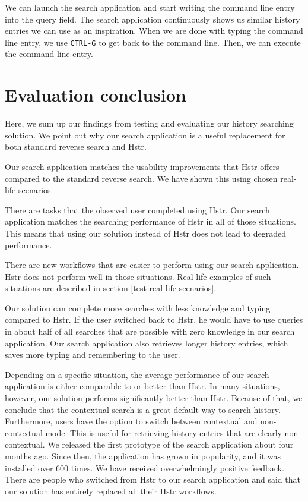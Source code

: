 
We can launch the search application and start writing the command line entry into the query field. The search application continuously shows us similar history entries we can use as an inspiration. When we are done with typing the command line entry, we use \verb|CTRL-G| to get back to the command line. Then, we can execute the command line entry.


\section{Evaluation conclusion}


Here, we sum up our findings from testing and evaluating our history searching solution. We point out why our search application is a useful replacement for both standard reverse search and Hstr. 

Our search application matches the usability improvements that Hstr offers compared to the standard reverse search. We have shown this using chosen real-life scenarios.

There are tasks that the observed user completed using Hstr. Our search application matches the searching performance of Hstr in all of those situations. This means that using our solution instead of Hstr does not lead to degraded performance.

There are new workflows that are easier to perform using our search application. Hstr does not perform well in those situations. Real-life examples of such situations are described in section \ref{test-real-life-scenarios}.

Our solution can complete more searches with less knowledge and typing compared to Hstr. If the user switched back to Hstr, he would have to use queries in about half of all searches that are possible with zero knowledge in our search application. Our search application also retrieves longer history entries, which saves more typing and remembering to the user.

Depending on a specific situation, the average performance of our search application is either comparable to or better than Hstr. In many situations, however, our solution performs significantly better than Hstr. Because of that, we conclude that the contextual search is a great default way to search history. Furthermore, users have the option to switch between contextual and non-contextual mode. This is useful for retrieving history entries that are clearly non-contextual.
We released the first prototype of the search application about four months ago. Since then, the application has grown in popularity, and it was installed over 600 times. We have received overwhelmingly positive feedback. There are people who switched from Hstr to our search application and said that our solution has entirely replaced all their Hstr workflows.



